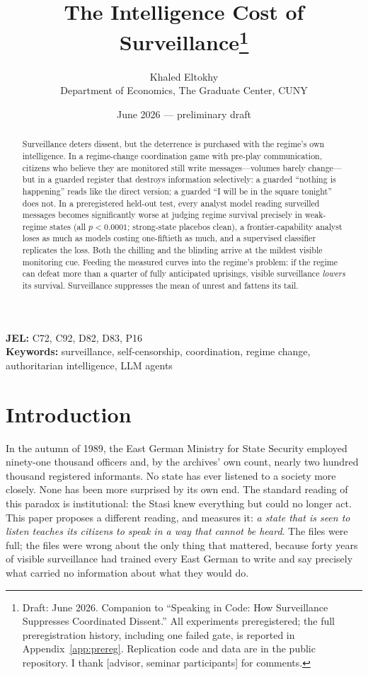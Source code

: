 \documentclass[11pt]{article}
\title{The Intelligence Cost of Surveillance\thanks{Draft: June 2026. Companion to ``Speaking in Code: How Surveillance Suppresses Coordinated Dissent.'' All experiments preregistered; the full preregistration history, including one failed gate, is reported in Appendix~\ref{app:prereg}. Replication code and data are in the public repository. I thank [advisor, seminar participants] for comments.}}
\author{Khaled Eltokhy\\ \small Department of Economics, The Graduate Center, CUNY}
\date{June 2026 --- preliminary draft}
\theoremstyle{remark}
\begin{document}
\maketitle

\begin{abstract}
\noindent Surveillance deters dissent, but the deterrence is purchased with the regime's own intelligence. In a regime-change coordination game with pre-play communication, citizens who believe they are monitored still write messages---volumes barely change---but in a guarded register that destroys information selectively: a guarded ``nothing is happening'' reads like the direct version; a guarded ``I will be in the square tonight'' does not. In a preregistered held-out test, every analyst model reading surveilled messages becomes significantly worse at judging regime survival precisely in weak-regime states (all $p<0.0001$; strong-state placebos clean), a frontier-capability analyst loses as much as models costing one-fiftieth as much, and a supervised classifier replicates the loss. Both the chilling and the blinding arrive at the mildest visible monitoring cue. Feeding the measured curves into the regime's problem: if the regime can defeat more than a quarter of fully anticipated uprisings, visible surveillance \emph{lowers} its survival. Surveillance suppresses the mean of unrest and fattens its tail.
\end{abstract}

\medskip
\noindent\textbf{JEL:} C72, C92, D82, D83, P16\\
\textbf{Keywords:} surveillance, self-censorship, coordination, regime change, authoritarian intelligence, LLM agents

\section{Introduction}\label{sec:intro}

In the autumn of 1989, the East German Ministry for State Security employed ninety-one thousand officers and, by the archives' own count, nearly two hundred thousand registered informants. No state has ever listened to a society more closely. None has been more surprised by its own end. The standard reading of this paradox is institutional: the Stasi knew everything but could no longer act. This paper proposes a different reading, and measures it: \emph{a state that is seen to listen teaches its citizens to speak in a way that cannot be heard}. The files were full; the files were wrong about the only thing that mattered, because forty years of visible surveillance had trained every East German to write and say precisely what carried no information about what they would do.
\end{document}
